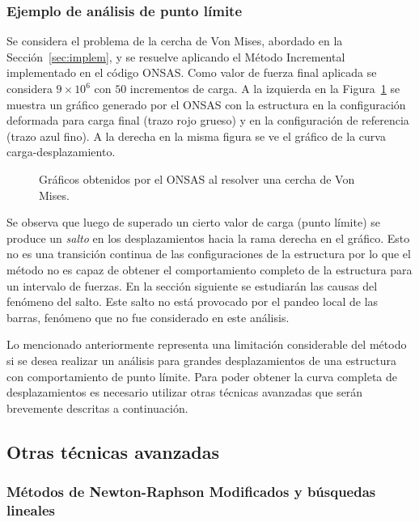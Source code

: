 \subsubsection{Ejemplo de análisis de punto límite}

Se considera el problema de la cercha de Von Mises, abordado en la Sección~\ref{sec:implem}, y se resuelve aplicando el Método Incremental implementado en el código ONSAS. %
%
Como valor de fuerza final aplicada se considera $9\times 10^6$ con $50$ incrementos de carga. %
%
A la izquierda en la Figura~\ref{fig:woodvonmises} se muestra un gráfico generado por el ONSAS con la estructura en la configuración deformada para carga final (trazo rojo grueso) y en la configuración de referencia (trazo azul fino). A la derecha en la misma figura se ve el gráfico de la curva carga-desplazamiento. %

\begin{figure}[htb!]
	\centering
	\resizebox{.46\linewidth}{!}{}
	\resizebox{.46\linewidth}{!}{}
	\caption{Gráficos obtenidos por el ONSAS al resolver una cercha de Von Mises.}
	\label{fig:woodvonmises}
\end{figure}

Se observa que luego de superado un cierto valor de carga (punto límite) se produce un \textit{salto} en los desplazamientos hacia la rama derecha en el gráfico. %
%
Esto no es una transición continua de las configuraciones de la estructura por lo que el método no es capaz de obtener el comportamiento completo de la estructura para un intervalo de fuerzas. %
%
En la sección siguiente se estudiarán las causas del fenómeno del salto. %
%
Este salto no está provocado por el pandeo local de las barras, fenómeno que no fue considerado en este análisis.

%
Lo mencionado anteriormente representa una limitación considerable del método si se desea realizar un análisis para grandes desplazamientos de una estructura con comportamiento de punto límite. %
%
Para poder obtener la curva completa de desplazamientos es necesario utilizar otras técnicas avanzadas que serán brevemente descritas a continuación.


\subsection{Otras técnicas avanzadas}

\subsubsection{Métodos de Newton-Raphson Modificados y búsquedas lineales}

